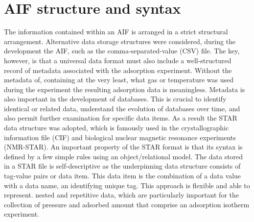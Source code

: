 \documentclass[journal=langd5,manuscript=article]{achemso}
\begin{document}
\section{AIF structure and syntax}
The information contained within an AIF is arranged in a strict structural arrangement.
Alternative data storage structures were considered, during the development the AIF,  such as the comma-separated-value (CSV) file.
The key, however, is that a universal data format must also include a well-structured record of metadata associated with the adsorption experiment.
Without the metadata of, containing at the very least, what gas or temperature was used during the experiment the resulting adsorption data is meaningless.
Metadata is also important in the development of databases.
This is crucial to identify identical or related data, understand the evolution of databases over time, and also permit further examination for specific data items.
As a result the STAR data structure was adopted,\cite{10.1021/ci00019a005} which is famously used in the crystallographic information file (CIF) and biological nuclear magnetic resonance experiments (NMR-STAR).\cite{10.1107/S010876739101067X,10.1007/s10858-018-0220-3}
An important property of the STAR format is that its syntax is defined by a few simple rules using an object/relational model.
The data stored in a STAR file is self-descriptive as the underpinning data structure consists of tag-value pairs or data item.
This data item is the combination of a data value with a data name, an identifying unique tag.
This approach is flexible and able to represent. nested and repetitive data, which are particularly important for the collection of pressure and adsorbed amount that comprise an adsorption isotherm experiment.
\end{document}
